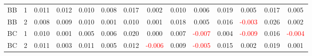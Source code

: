 \begin{table}[H]
{\begin{tabular}{llcccccccccccc}
BB & 1 & 0.011 & 0.012 & 0.010 & 0.008 & 0.017 & 0.002 & 0.010 & 0.006 & 0.019 & 0.005 & 0.017 & 0.005\\
BB & 2 & 0.008 & 0.009 & 0.010 & 0.001 & 0.010 & 0.001 & 0.018 & 0.005 & 0.016 & \textcolor{red}{-0.003} & 0.026 & 0.002\\
BC & 1 & 0.010 & 0.001 & 0.005 & 0.006 & 0.020 & 0.000 & 0.007 & \textcolor{red}{-0.007} & 0.004 & \textcolor{red}{-0.009} & 0.016 & \textcolor{red}{-0.004}\\
BC & 2 & 0.011 & 0.003 & 0.011 & 0.005 & 0.012 & \textcolor{red}{-0.006} & 0.009 & \textcolor{red}{-0.005} & 0.015 & 0.002 & 0.019 & 0.001\\
\hline
    \end{tabular}%
    }
    \label{tab:cen4_sh}
\end{table}


